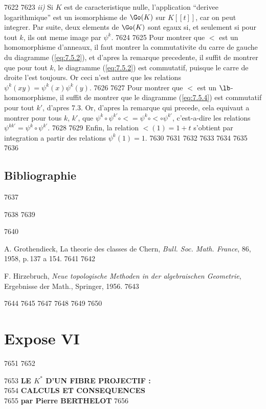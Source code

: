   7622	
  7623	\emph{ii)} Si $K$ est de caracteristique nulle, l'application ``derivee logarithmique'' est un isomorphisme de $\Go(K)$ sur $K[[t]]$, car on peut integrer. Par suite, deux elements de $\Go(K)$ sont egaux si, et seulement si pour tout $k$, ils ont meme image par $\psi^k$.
  7624	
  7625	Pour montrer que $\lt$ est un homomorphisme d'anneaux, il faut montrer la commutativite du carre de gauche du diagramme (\ref{eq:7.5.2}), et d'apres la remarque precedente, il suffit de montrer que pour tout $k$, le diagramme (\ref{eq:7.5.2}) est commutatif, puisque le carre de droite l'est toujours. Or ceci n'est autre que les relations $\psi^k(xy) = \psi^k(x)\psi^k(y)$.
  7626	
  7627	Pour montrer que $\lt$ est un $\lb$-homomorphisme, il suffit de montrer que le diagramme (\ref{eq:7.5.4}) est commutatif pour tout $k'$, d'apres 7.3. Or, d'apres la remarque qui precede, cela equivaut a montrer pour tous $k$, $k'$, que $\psi^k \circ \psi^{k'} \circ \lt = \psi^k \circ \lt \circ \psi^{k'}$, c'est-a-dire les relations $\psi^{kk'} = \psi^k \circ \psi^{k'}$.
  7628	
  7629	Enfin, la relation $\lt(1) = 1+t$ s'obtient par integration a partir des relations $\psi^k(1) = 1$.
  7630	
  7631	\vspace{1em}
  7632	
  7633	%
  7634	%
  7635	%
  7636	\subsection*{Bibliographie}
  7637	
  7638	
  7639	\begin{enumerate}[label={[\arabic*]}]
  7640	\item A. Grothendieck, La theorie des classes de Chern, \emph{Bull. Soc. Math. France}, 86, 1958, p.\,137 a 154.
  7641	
  7642	\item F. Hirzebruch, \emph{Neue topologische Methoden in der algebraischen Geometrie}, Ergebnisse der Math., Springer, 1956.
  7643	\end{enumerate}
  7644	
  7645		
  7647	%
  7648	%
  7649	%
  7650	\section*{Expose VI}
  7651	
  7652	\begin{center}
  7653	\Large\textbf{LE $K^*$ D'UN FIBRE PROJECTIF :}\\[0.3em]
  7654	\Large\textbf{CALCULS ET CONSEQUENCES}\\[1em]
  7655	\large\textbf{par Pierre BERTHELOT}
  7656	\end{center}
